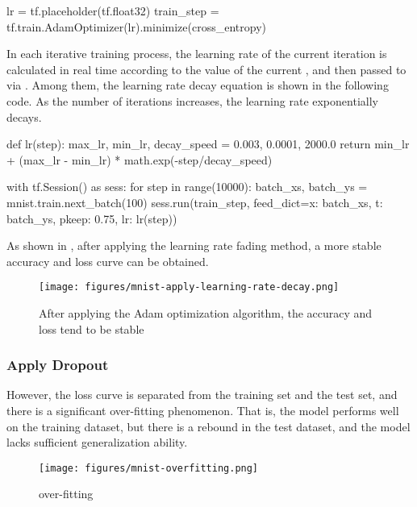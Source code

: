 \begin{content}
\begin{content}
\begin{leftbar}
\begin{python}
lr = tf.placeholder(tf.float32)
train_step = tf.train.AdamOptimizer(lr).minimize(cross_entropy)
\end{python}
\end{leftbar}

In each iterative training process, the learning rate of the current iteration  is calculated in real time according to the value of the current , and then passed to  via  . Among them, the learning rate decay equation is shown in the following code. As the number of iterations increases, the learning rate exponentially decays.

\begin{leftbar}
\begin{python}
def lr(step):
  max_lr, min_lr, decay_speed = 0.003, 0.0001, 2000.0
  return min_lr + (max_lr - min_lr) * math.exp(-step/decay_speed)

with tf.Session() as sess:
  for step in range(10000):
    batch_xs, batch_ys = mnist.train.next_batch(100)
    sess.run(train_step, 
      feed_dict={x: batch_xs, t: batch_ys, pkeep: 0.75, lr: lr(step)})
\end{python}
\end{leftbar}

As shown in , after applying the learning rate fading method, a more stable accuracy and loss curve can be obtained.

\begin{figure}[H]
  \centering
  \texttt{[image: figures/mnist-apply-learning-rate-decay.png]}
  \caption{After applying the Adam optimization algorithm, the accuracy and loss tend to be stable}
  \label{fig:mnist-apply-learning-rate-decay}
\end{figure}


\subsubsection{Apply Dropout}
However, the loss curve is separated from the training set and the test set, and there is a significant over-fitting phenomenon. That is, the model performs well on the training dataset, but there is a rebound in the test dataset, and the model lacks sufficient generalization ability.

\begin{figure}[H]
  \centering
  \texttt{[image: figures/mnist-overfitting.png]}
  \caption{over-fitting}
  \label{fig:mnist-overfitting}
\end{figure}


\end{content}
\end{content}
